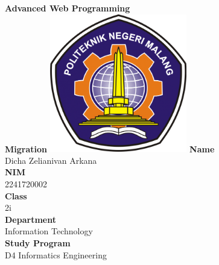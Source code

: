 \documentclass[12pt,titlepage]{article}
\newcommand{\vSubject}{Advanced Web Programming}
\newcommand{\vSubtitle}{Migration}
\newcommand{\vName}{Dicha Zelianivan Arkana}
\newcommand{\vNIM}{2241720002}
\newcommand{\vClass}{2i}
\newcommand{\vDepartment}{Information Technology}
\newcommand{\vStudyProgram}{D4 Informatics Engineering}
\begin{document}
\begin{titlepage}
    \centering
    \vfill
    {\bfseries\LARGE
        \vSubject\\
        \vskip0.25cm
        \vSubtitle
    }
    \vfill
    \includegraphics[width=6cm]{images/polinema-logo.png}
    \vfill
    {
        \textbf{Name}\\
        \vName\\
        \vskip0.5cm
        \textbf{NIM}\\
        \vNIM\\
        \vskip0.5cm
        \textbf{Class}\\
        \vClass\\
        \vskip0.5cm
        \textbf{Department}\\
        \vDepartment\\
        \vskip0.5cm
        \textbf{Study Program}\\
        \vStudyProgram
    }
\end{titlepage}
\end{document}
